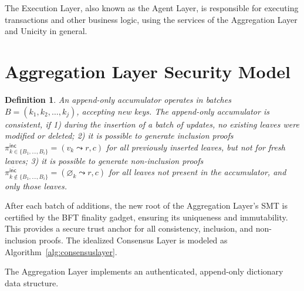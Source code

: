 \documentclass[twocolumn]{article}
\newtheorem{definition}{Definition}
\begin{document}
The Execution Layer, also known as the Agent Layer, is responsible for executing transactions and other business logic, using the services of the Aggregation Layer and Unicity in general.


\section{Aggregation Layer Security Model}

\begin{definition}
An append-only accumulator operates in batches $B = (k_1, k_2, \ldots, k_j)$, accepting new keys. The append-only accumulator is \emph{consistent}, if 1) during the insertion of a batch of updates, no existing leaves were modified or deleted; 2) it is possible to generate inclusion proofs $\pi^{\textsf{inc}}_{k \in \{B_1, \dots, B_i\}} = (v_k \leadsto r, c)$ for all previously inserted leaves, but not for \emph{fresh} leaves; 3) it is possible to generate non-inclusion proofs $\pi^{\overline{\textsf {inc}}}_{k \notin \{B_1, \dots, B_i\}} = (\varnothing_k \leadsto r, c)$ for all leaves not present in the accumulator, and only those leaves.
\label{def:append-only-accumulator}
\end{definition}



After each batch of additions, the new root of the Aggregation Layer's SMT is certified by the BFT finality gadget, ensuring its uniqueness and immutability. This provides a secure trust anchor for all consistency, inclusion, and non-inclusion proofs. The idealized Consensus Layer is modeled as Algorithm~\ref{alg:consensuslayer}.


The Aggregation Layer implements an authenticated, append-only dictionary data structure.
\end{document}
